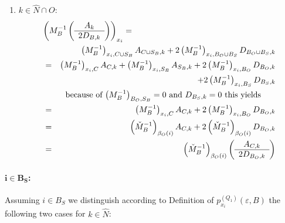 \documentclass[a4paper]{article}
\begin{document}
\begin{enumerate}
\item $k \in \hat{N} \cap O$:
\begin{eqnarray}
\label{eq:r1_i_B_O_k_N_O}
\lefteqn{\left(M_{B}^{-1}
           \left(\begin{array}{c}
                   A_{k} \\
	           \hline
	           2D_{B, k}
	         \end{array}
           \right)
         \right)_{x_{i}}
=} \nonumber \\
&&
\left(M_{B}^{-1}\right)_{x_{i}, C \cup S_{B}}A_{C \cup S_{B}, k}
+2\left(M_{B}^{-1}\right)_{x_{i}, B_{O} \cup B_{S}}D_{B_{O} \cup B_{S}, k}
\nonumber \\
&=&
\left(M_{B}^{-1}\right)_{x_{i}, C}A_{C, k}
+\left(M_{B}^{-1}\right)_{x_{i}, S_{B}}A_{S_{B}, k}
+2\left(M_{B}^{-1}\right)_{x_{i}, B_{O}}D_{B_{O}, k}
\nonumber \\
&&
+2\left(M_{B}^{-1}\right)_{x_{i}, B_{S}}D_{B_{S}, k}
\nonumber \\
&&\begin{minipage}{9cm}
because of $\left(M_{B}^{-1}\right)_{B_{O}, S_{B}}=0$ and
$D_{B_{S},k}=0$ this yields 
\end{minipage}
\nonumber \\
&=&
\left(M_{B}^{-1}\right)_{x_{i}, C}A_{C, k}
+2\left(M_{B}^{-1}\right)_{x_{i}, B_{O}}D_{B_{O}, k}
\nonumber \\
&=&
\left(\check{M}_{B}^{-1}\right)_{\beta_{O}(i)}A_{C,k}
+2\left(\check{M}_{B}^{-1}\right)_{\beta_{O}(i)}D_{B_{O}, k}
\nonumber \\
&=&
\left(\check{M}_{B}^{-1}\right)_{\beta_{O}(i)}
\left(\begin{array}{c}
        A_{C, k} \\
	\hline
	2D_{B_{O}, k}
      \end{array}
\right)
\end{eqnarray}
\end{enumerate}


\paragraph{$\mathbf{i \in B_{S}}$:}
Assuming $i \in B_{S}$ we distinguish
according to Definition of $p_{x_{i}}^{(Q_{1})}(\varepsilon, B)$
the following two cases for $k \in \hat{N}$:
\end{document}
